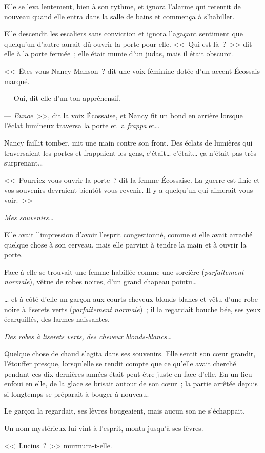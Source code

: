 Elle se leva lentement, bien à son rythme, et ignora l'alarme qui retentit de nouveau quand elle entra dans la salle de bains et commença à s'habiller.

Elle descendit les escaliers sans conviction et ignora l'agaçant sentiment que quelqu'un d'autre aurait dû ouvrir la porte pour elle. <<~Qui est là~?~>> dit-elle à la porte fermée~; elle était munie d'un judas, mais il était obscurci.

<<~Êtes-vous Nancy Manson~? dit une voix féminine dotée d'un accent Écossais marqué.

--- Oui, dit-elle d'un ton appréhensif.

--- \emph{Eunoe}~>>, dit la voix Écossaise, et Nancy fit un bond en arrière lorsque l'éclat lumineux traversa la porte et la \emph{frappa} et…

Nancy faillit tomber, mit une main contre son front. Des éclats de lumières qui traversaient les portes et frappaient les gens, c'était… c'était… ça n'était pas très surprenant…

<<~Pourriez-vous ouvrir la porte~? dit la femme Écossaise. La guerre est finie et vos souvenirs devraient bientôt vous revenir. Il y a quelqu'un qui aimerait vous voir.~>>

\emph{Mes souvenirs…}

Elle avait l'impression d'avoir l'esprit congestionné, comme si elle avait arraché quelque chose à son cerveau, mais elle parvint à tendre la main et à ouvrir la porte.

Face à elle se trouvait une femme habillée comme une sorcière (\emph{parfaitement normale}), vêtue de robes noires, d'un grand chapeau pointu…

… et à côté d'elle un garçon aux courts cheveux blonds-blancs et vêtu d'une robe noire à liserets verts (\emph{parfaitement normale})~; il la regardait bouche bée, ses yeux écarquillés, des larmes naissantes.

\emph{Des robes à liserets verts, des cheveux blonds-blancs…}

Quelque chose de chaud s'agita dans ses souvenirs. Elle sentit son cœur grandir, l'étouffer presque, lorsqu'elle se rendit compte que ce qu'elle avait cherché pendant ces dix dernières années était peut-être juste en face d'elle. En un lieu enfoui en elle, de la glace se brisait autour de son cœur~; la partie arrêtée depuis si longtemps se préparait à bouger à nouveau.

Le garçon la regardait, ses lèvres bougeaient, mais aucun son ne s'échappait.

Un nom mystérieux lui vint à l'esprit, monta jusqu'à ses lèvres.

<<~Lucius~?~>> murmura-t-elle.

